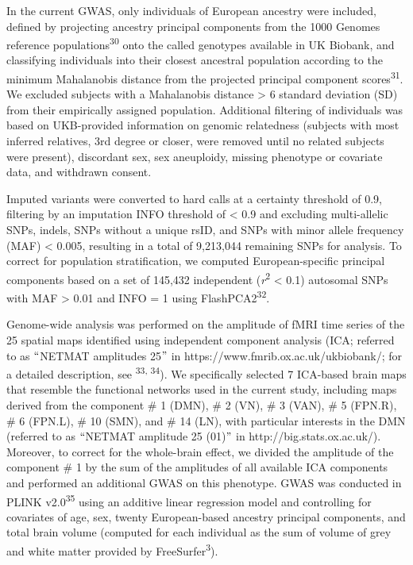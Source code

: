 \begin{refsection}
In the current GWAS, only individuals of European ancestry were included, defined by projecting ancestry principal components from the 1000 Genomes reference populations\textsuperscript{30} onto the called genotypes available in UK Biobank, and classifying individuals into their closest ancestral population according to the minimum Mahalanobis distance from the projected principal component scores\textsuperscript{31}. We excluded subjects with a Mahalanobis distance > 6 standard deviation (SD) from their empirically assigned population. Additional filtering of individuals was based on UKB-provided information on genomic relatedness (subjects with most inferred relatives, 3rd degree or closer, were removed until no related subjects were present), discordant sex, sex aneuploidy, missing phenotype or covariate data, and withdrawn consent.

Imputed variants were converted to hard calls at a certainty threshold of 0.9, filtering by an imputation INFO threshold of < 0.9 and excluding multi-allelic SNPs, indels, SNPs without a unique rsID, and SNPs with minor allele frequency (MAF) < 0.005, resulting in a total of 9,213,044 remaining SNPs for analysis. To correct for population stratification, we computed European-specific principal components based on a set of 145,432 independent (\textit{r}\textsuperscript{2 }< 0.1) autosomal SNPs with MAF > 0.01 and INFO = 1 using FlashPCA2\textsuperscript{32}.

Genome-wide analysis was performed on the amplitude of fMRI time series of the 25 spatial maps identified using independent component analysis (ICA; referred to as $``$NETMAT amplitudes 25$"$  in https://www.fmrib.ox.ac.uk/ukbiobank/; for a detailed description, see \textsuperscript{33, 34}). We specifically selected 7 ICA-based brain maps that resemble the functional networks used in the current study, including maps derived from the component $\#$ 1 (DMN), $\#$ 2 (VN), $\#$ 3 (VAN), $\#$ 5 (FPN.R), $\#$ 6 (FPN.L), $\#$ 10 (SMN), and $\#$ 14 (LN), with particular interests in the DMN (referred to as $``$NETMAT amplitude 25 (01)$"$  in http://big.stats.ox.ac.uk/). Moreover, to correct for the whole-brain effect, we divided the amplitude of the component $\#$ 1 by the sum of the amplitudes of all available ICA components and performed an additional GWAS on this phenotype. GWAS was conducted in PLINK v2.0\textsuperscript{35} using an additive linear regression model and controlling for covariates of age, sex, twenty European-based ancestry principal components, and total brain volume (computed for each individual as the sum of volume of grey and white matter provided by FreeSurfer\textsuperscript{3}).


\end{refsection}
